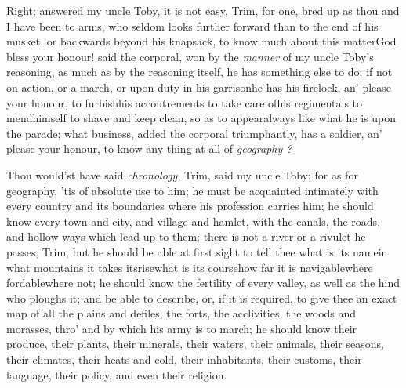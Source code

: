 \documentclass{article}
\begin{document}
Right; answered my uncle Toby, it is not easy,
Trim, for one, bred up as thou and I have been to arms, who
seldom looks further forward than to the end of his
musket, or backwards beyond his knapsack, to know much about this
matter\tsh God bless your honour! said the corporal, won
by the \textit{manner} of my uncle Toby’s reasoning, as much as
by the reasoning itself, he has something else to do; if not on
action, or a march, or upon duty in his garrison\tsk he has his
firelock, an’ please your honour, to furbish\tsk his
accoutrements to take care of\tsk his regimentals to
mend\tsk himself to shave and keep clean, so as to appear\pb always
like what he is upon the parade; what business, added the corporal
triumphantly, has a soldier, an’ please your honour, to know
any thing at all of \textit{geography ?}

\tsh Thou would’st have said \textit{chro\-no\-logy},
Trim, said my uncle Toby; for as for geography,
’tis of absolute use to him; he must be acquainted intimately
with every country and its boundaries where his profession carries
him; he should know every town and city, and village and hamlet,
with the canals, the roads, and hollow ways which lead up to them; there
is not a river or a rivulet he passes, Trim, but he should
be able at first sight to tell thee what is its name\tsk in what
mountains it takes its\pb rise\tsk what is its course\tsk how far
it is navigable\tsk where fordable\tsk where not; he should
know the fertility of every valley, as well as the hind who ploughs
it; and be able to describe, or, if it is required, to give thee an
exact map of all the plains and defiles, the forts, the
acclivities, the woods and morasses, thro’ and by which his
army is to march; he should know their produce, their plants, their
minerals, their waters, their animals, their seasons, their
climates, their heats and cold, their inhabitants, their customs,
their language, their policy, and even their religion.
\end{document}
